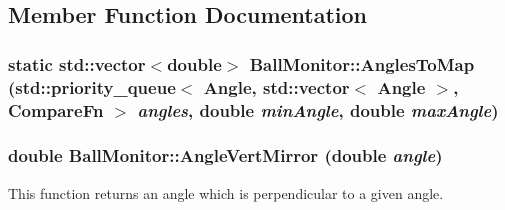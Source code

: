 \subsection{Member Function Documentation}
\hypertarget{classBallMonitor_a8f3198b6b4ef8eb52c0ff04afd33cc8f}{
\subsubsection[{AnglesToMap}]{\setlength{\rightskip}{0pt plus 5cm}static std::vector$<$double$>$ BallMonitor::AnglesToMap (std::priority\_\-queue$<$ {\bf Angle}, std::vector$<$ {\bf Angle} $>$, {\bf CompareFn} $>$ {\em angles}, \/  double {\em minAngle}, \/  double {\em maxAngle})}}
\label{classBallMonitor_a8f3198b6b4ef8eb52c0ff04afd33cc8f}
\hypertarget{classBallMonitor_a32d7b6d877b84c7d7fd9bc9ffe659562}{
\subsubsection[{AngleVertMirror}]{\setlength{\rightskip}{0pt plus 5cm}double BallMonitor::AngleVertMirror (double {\em angle})}}
\label{classBallMonitor_a32d7b6d877b84c7d7fd9bc9ffe659562}


This function returns an angle which is perpendicular to a given angle. 


